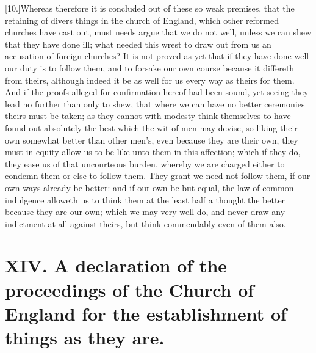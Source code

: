 [10.]Whereas therefore it is concluded out of these so weak premises, that the retaining of divers things in the church of England, which other reformed churches have cast out, must needs argue that we do not well, unless we can shew that they have done ill; what needed this wrest to  draw out from us an accusation of foreign churches? It is not proved as yet that if they have done well our duty is to follow them, and to forsake our own course because it differeth from theirs, although indeed it be as well for us every way as theirs for them. And if the proofs alleged for confirmation hereof had been sound, yet seeing they lead no further than only to shew, that where we can have no better ceremonies theirs must be taken; as they cannot with modesty think themselves to have found out absolutely the best which the wit of men may devise, so liking their own somewhat better than other men’s, even because they are their own, they must in equity allow us to be like unto them in this affection; which if they do, they ease us of that uncourteous burden, whereby we are charged either to condemn them or else to follow them. They grant we need not follow them, if our own ways already be better: and if our own be but equal, the law of common indulgence alloweth us to think them at the least half a thought the better because they are our own; which we may very well do, and never draw any indictment at all against theirs, but think commendably even of them also.

\section*{XIV. A declaration of the proceedings of the Church of England for the establishment of things as they are.}

